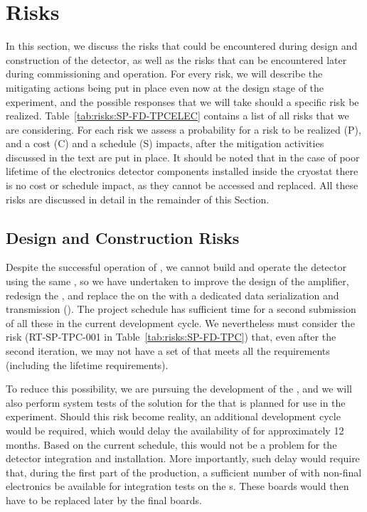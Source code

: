 \section{Risks}
\label{sec:fdsp-tpcelec-risks}

In this section, we discuss the risks that could be encountered during design
and construction of the   detector, as well as the
risks that can be encountered later during commissioning and operation.
For every risk, we will describe the mitigating actions 
being put in place even now at the design stage of the experiment, and the 
possible responses that we will take should a specific risk be realized. 
Table~\ref{tab:risks:SP-FD-TPCELEC} contains a list of all risks that we are 
considering. For each risk we assess a probability for a risk to be
realized (P), and a cost (C) and a schedule (S) impacts, after the 
mitigation activities discussed in the text are put in place. It should
be noted that in the case of poor lifetime of the  electronics detector
components installed inside the cryostat there is no cost or schedule
impact, as they cannot be accessed and replaced.
All these risks are discussed in detail in the remainder of this
Section.



\subsection{Design and Construction Risks}
\label{sec:fdsp-tpcelec-risks-design}

Despite the successful operation of , we cannot build and operate
the   detector using the same , so we have
undertaken to improve the design of the  amplifier, redesign
the , and replace the  on the  with a dedicated data
serialization and transmission  (). The project schedule has
sufficient time for a second submission of all these  in the current 
development cycle. We  nevertheless must consider the risk (RT-SP-TPC-001
in Table~\ref{tab:risks:SP-FD-TPC}) that, even after the second iteration, 
we may not have a set of  that meets all the  requirements
(including the lifetime requirements). 

To reduce this possibility, we are pursuing the development of the  , and we
will also perform system tests of the  solution for the  that is planned 
for use in the  experiment. Should this risk become reality, an
additional development cycle would be required, which would delay the availability
of  for approximately 12 months. Based on the current schedule, this would
not be a problem for the detector integration and installation.
More importantly, such delay would require
that, during the first part of the  production, a sufficient number
of  with non-final electronics be available for integration tests
on the s. These boards would then have to be replaced later
by the final boards.

